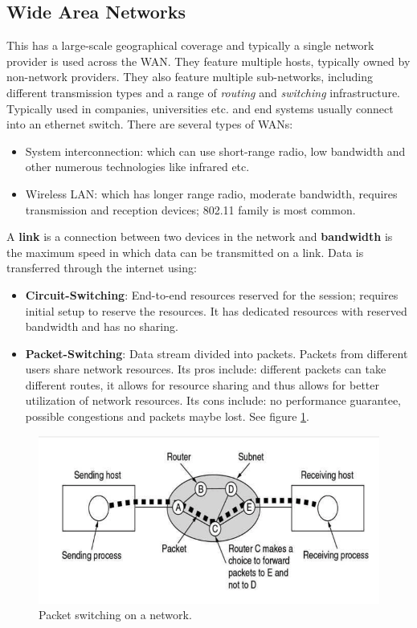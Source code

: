 \documentclass[twoside]{article}
\begin{document}
\subsection{Wide Area Networks}
This has a large-scale geographical coverage and typically a single network
provider is used across the WAN. They feature multiple hosts, typically owned
by non-network providers. They also feature multiple sub-networks, including
different transmission types and a range of \emph{routing} and \emph{switching}
infrastructure. Typically used in companies, universities etc. and end systems
usually connect into an ethernet switch. There are several types of WANs:
\begin{itemize}
    \item System interconnection: which can use short-range radio, low bandwidth
    and other numerous technologies like infrared etc.
    \item Wireless LAN: which has longer range radio, moderate bandwidth,
    requires transmission and reception devices; 802.11 family is most common.
\end{itemize}
A \textbf{link} is a connection between two devices in the network and 
\textbf{bandwidth} is the maximum speed in which data can be transmitted on
a link. Data is transferred through the internet using:
\begin{itemize}
    \item \textbf{Circuit-Switching}: End-to-end resources reserved for the 
    session; requires initial setup to reserve the resources. It has 
    dedicated resources with reserved bandwidth and has no sharing.
    \item \textbf{Packet-Switching}: Data stream divided into packets. Packets
    from different users share network resources. Its pros include: different
    packets can take different routes, it allows for resource sharing and thus
    allows for better utilization of network resources. Its cons include: no
    performance guarantee, possible congestions and packets maybe lost. See 
    figure \ref{fig:packet-switch}.
\end{itemize}
\begin{figure}
  \includegraphics[width=\linewidth]{packet-switch.png}
  \caption{Packet switching on a network.}
  \label{fig:packet-switch}
\end{figure}
\end{document}
